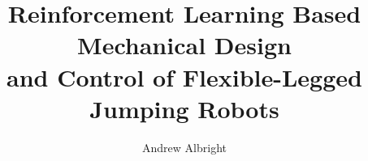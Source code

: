 \documentclass[12pt,normalmargins]{gatech-thesis}
\title{Reinforcement Learning Based Mechanical Design \\ and Control of Flexible-Legged Jumping Robots}
\author{Andrew Albright}
\begin{document}
\iraggedright


\begin{preliminary}


% 







\contents
\end{preliminary}





















\begin{postliminary}

% 
\end{postliminary}






\end{document}
